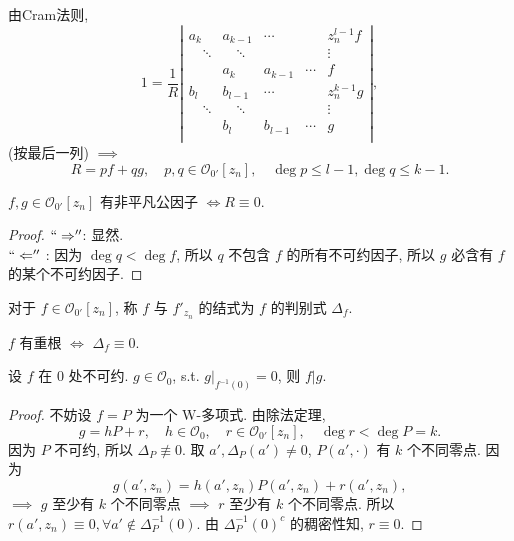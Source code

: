 由Cram法则, 
$$  1 = \frac{1}{R} \left| \begin{array}{ccccc} a_{k} & a_{k-1} & \cdots  & & z_{n}^{l-1}f \\ \quad\ddots & \quad\ddots &  &  & \vdots  \\ 
  & a_{k}&a_{k-1} & \cdots  & f\\ b_{l} & b_{l-1} & \cdots  & &z_{n}^{k-1}g \\ \quad\ddots & \quad\ddots &  &  & \vdots  \\ 
  & b_{l}&b_{l-1} & \cdots  & g\\ \end{array} \right|  ,$$
(按最后一列) $\implies $ 
 $$ R=pf+q g, \quad p,q \in \mathcal{O}_{0'}[z_n], \quad \deg p \leq l-1, \deg q \leq k-1 .$$

 \begin{theorem}
  $f ,g \in \mathcal{O}_{0'}[z_n]$ 有非平凡公因子 $\Leftrightarrow R \equiv 0$. 
 \end{theorem}
\begin{proof}
  $``\Rightarrow ''$:  显然.\\
  $``\Leftarrow ''$ : 因为 $\deg q < \deg f$, 所以 $q$ 不包含 $f$ 的所有不可约因子, 所以 $g$  必含有 $f$ 的某个不可约因子.   
\end{proof}

\begin{definition}
  对于 $f \in \mathcal{O}_{0'}[z_n]$, 称 $f$ 与 $f'_{z_n}$  的结式为 $f $ 的判别式 $\Delta _f$.   
\end{definition}

\begin{corollary}
  $f$ 有重根 $\iff $ $\Delta _f \equiv 0$.   
\end{corollary}

\begin{theorem}
  设 $f$ 在 $0$ 处不可约. $g \in \mathcal{O}_0$, s.t. $g|_{f^{-1}(0)}=0$, 则 $f|g$.     
\end{theorem}
\begin{proof}
  不妨设 $f=P$ 为一个 W-多项式. 
  由除法定理, 
  $$g=hP+r,\quad h \in \mathcal{O}_0, \quad r \in \mathcal{O}_{0'}[z_n], \quad \deg r < \deg P =k.$$ 
  因为 $P$ 不可约, 所以 $\Delta _P \not \equiv 0$. 取 $a', \Delta_P(a' ) \neq 0$, $P(a', \cdot )$  有 $k$  个不同零点.   
  因为 
  $$ g(a',z_n)=h(a',z_n)P(a',z_n)+r(a',z_n), $$
  $\implies $  $g$ 至少有 $k$ 个不同零点  $\implies $ $r$  至少有 $k$ 个不同零点.
  所以 $r(a',z_n) \equiv 0, \forall a' \not \in \Delta _{P}^{-1}(0)$. 由 $\Delta _{P}^{-1}(0)^c$ 的稠密性知, $r \equiv 0$.     
\end{proof}


